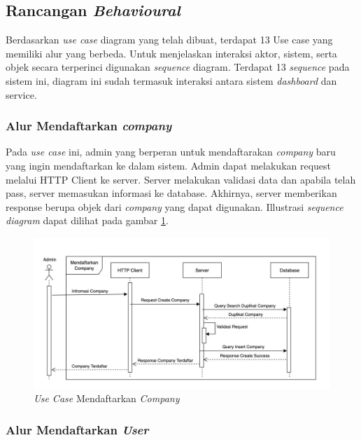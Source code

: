 \subsection{Rancangan \textit{Behavioural}}
\label{subsec:arsitektur-behavioural}

Berdasarkan \textit{use case} diagram yang telah dibuat, terdapat 13 Use case yang memiliki alur yang berbeda. Untuk menjelaskan interaksi aktor, sistem, serta objek secara terperinci digunakan \textit{sequence} diagram. Terdapat 13 \textit{sequence} pada sistem ini, diagram ini sudah termasuk interaksi antara sistem \textit{dashboard} dan service.

\subsubsection{Alur Mendaftarkan \textit{company}}

Pada \textit{use case} ini, admin yang berperan untuk mendaftarakan \textit{company} baru yang ingin mendaftarkan ke dalam sistem. Admin dapat melakukan request melalui HTTP Client ke server. Server melakukan validasi data dan apabila telah pass, server memasukan informasi ke database. Akhirnya, server memberikan response berupa objek dari \textit{company} yang dapat digunakan. Illustrasi \textit{sequence diagram} dapat dilihat pada gambar \ref{fig:usecase-01}.

\begin{figure}
  \centering
  \includegraphics[width=1\textwidth]{resources/chapter-3/usecase/uc-01.jpg}
  \caption{\textit{Use Case} Mendaftarkan \textit{Company}}
  \label{fig:usecase-01}
\end{figure}

\pagebreak

\subsubsection{Alur Mendaftarkan \textit{User}}

